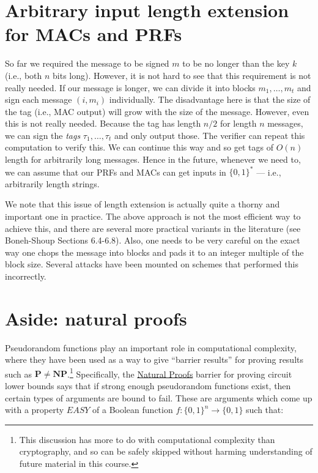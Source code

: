 \section{Arbitrary input length extension for MACs and
PRFs}\label{4-Arbitrary-input-length}

So far we required the message to be signed \(m\) to be no longer than
the key \(k\) (i.e., both \(n\) bits long). However, it is not hard to
see that this requirement is not really needed. If our message is
longer, we can divide it into blocks \(m_1,\ldots,m_t\) and sign each
message \((i,m_i)\) individually. The disadvantage here is that the size
of the tag (i.e., MAC output) will grow with the size of the message.
However, even this is not really needed. Because the tag has length
\(n/2\) for length \(n\) messages, we can sign the \emph{tags}
\(\tau_1,\ldots,\tau_t\) and only output those. The verifier can repeat
this computation to verify this. We can continue this way and so get
tags of \(O(n)\) length for arbitrarily long messages. Hence in the
future, whenever we need to, we can assume that our PRFs and MACs can
get inputs in \(\{0,1\}^*\) --- i.e., arbitrarily length strings.

We note that this issue of length extension is actually quite a thorny
and important one in practice. The above approach is not the most
efficient way to achieve this, and there are several more practical
variants in the literature (see Boneh-Shoup Sections 6.4-6.8). Also, one
needs to be very careful on the exact way one chops the message into
blocks and pads it to an integer multiple of the block size. Several
attacks have been mounted on schemes that performed this incorrectly.

\section{Aside: natural proofs}\label{4-Aside-natural-proofs}

Pseudorandom functions play an important role in computational
complexity, where they have been used as a way to give ``barrier
results'' for proving results such as
\(\mathbf{P}\neq \mathbf{NP}\).\footnote{This discussion has more to do
  with computational complexity than cryptography, and so can be safely
  skipped without harming understanding of future material in this
  course.} Specifically, the \href{https://goo.gl/fiH3Pe}{Natural
Proofs} barrier for proving circuit lower bounds says that if strong
enough pseudorandom functions exist, then certain types of arguments are
bound to fail. These are arguments which come up with a property
\(\ensuremath{\mathit{EASY}}\) of a Boolean function
\(f:\{0,1\}^n \rightarrow \{0,1\}\) such that:

